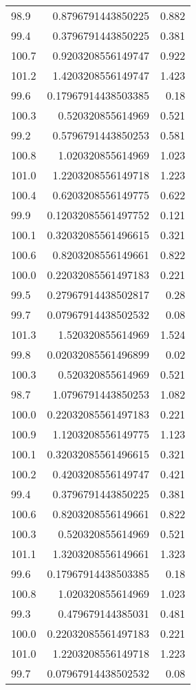 \begin{table}[h!]
\begin{tabular}{l | r | r}
98.9 & 0.8796791443850225 & 0.882 \\
99.4 & 0.3796791443850225 & 0.381 \\
100.7 & 0.9203208556149747 & 0.922 \\
101.2 & 1.4203208556149747 & 1.423 \\
99.6 & 0.17967914438503385 & 0.18 \\
100.3 & 0.520320855614969 & 0.521 \\
99.2 & 0.5796791443850253 & 0.581 \\
100.8 & 1.020320855614969 & 1.023 \\
101.0 & 1.2203208556149718 & 1.223 \\
100.4 & 0.6203208556149775 & 0.622 \\
99.9 & 0.12032085561497752 & 0.121 \\
100.1 & 0.32032085561496615 & 0.321 \\
100.6 & 0.8203208556149661 & 0.822 \\
100.0 & 0.22032085561497183 & 0.221 \\
99.5 & 0.27967914438502817 & 0.28 \\
99.7 & 0.07967914438502532 & 0.08 \\
101.3 & 1.520320855614969 & 1.524 \\
99.8 & 0.02032085561496899 & 0.02 \\
100.3 & 0.520320855614969 & 0.521 \\
98.7 & 1.0796791443850253 & 1.082 \\
100.0 & 0.22032085561497183 & 0.221 \\
100.9 & 1.1203208556149775 & 1.123 \\
100.1 & 0.32032085561496615 & 0.321 \\
100.2 & 0.4203208556149747 & 0.421 \\
99.4 & 0.3796791443850225 & 0.381 \\
100.6 & 0.8203208556149661 & 0.822 \\
100.3 & 0.520320855614969 & 0.521 \\
101.1 & 1.3203208556149661 & 1.323 \\
99.6 & 0.17967914438503385 & 0.18 \\
100.8 & 1.020320855614969 & 1.023 \\
99.3 & 0.479679144385031 & 0.481 \\
100.0 & 0.22032085561497183 & 0.221 \\
101.0 & 1.2203208556149718 & 1.223 \\
99.7 & 0.07967914438502532 & 0.08 \\

\end{tabular}
\end{table}
